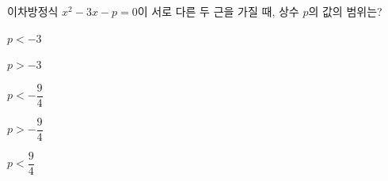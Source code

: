 이차방정식 $x^2-3x-p=0$이 서로 다른 두 근을 가질 때, 상수 $p$의 값의 범위는?
\begin{choices32}{\rule[-3ex]{0pt}{8ex}$p<-3$}{\rule[-3ex]{0pt}{8ex}$p>-3$}{\rule[-3ex]{0pt}{8ex}$p<-\dfrac{9}{4}$}{\rule[-3ex]{0pt}{8ex}$p>-\dfrac{9}{4}$}{\rule[-3ex]{0pt}{8ex}$p<\dfrac{9}{4}$}\end{choices32}

